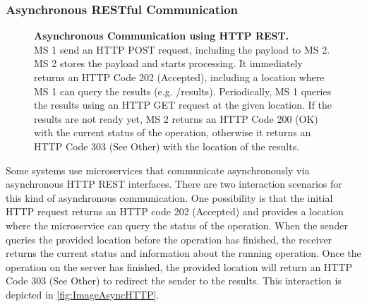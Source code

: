 \subsubsection{Asynchronous RESTful Communication}
\label{sec:Foundation:AsyncCommunication:REST}
\begin{figure}
\centering
\caption{\textbf{Asynchronous Communication using HTTP REST.} \\
MS 1 send an HTTP POST request, including the payload to MS 2. MS 2 stores the payload and starts processing. It immediately returns an HTTP Code 202 (Accepted), including a location where MS 1 can query the results (e.g. /results). Periodically, MS 1 queries the results using an HTTP GET request at the given location. If the results are not ready yet, MS 2 returns an HTTP Code 200 (OK) with the current status of the operation, otherwise it returns an HTTP Code 303 (See Other) with the location of the results.}
\label{fig:ImageAsyncHTTP}
\end{figure}

Some systems use microservices that communicate asynchronously via asynchronous HTTP REST interfaces.
There are two interaction scenarios for this kind of asynchronous communication.
One possibility is that the initial HTTP request returns an HTTP code 202 (Accepted) and provides a location where the microservice can query the status of the operation.
When the sender queries the provided location before the operation has finished, the receiver returns the current status and information about the running operation.
Once the operation on the server has finished, the provided location will return an HTTP Code 303 (See Other) to redirect the sender to the results. \cite{Mayer2018}
This interaction is depicted in \autoref{fig:ImageAsyncHTTP}.

